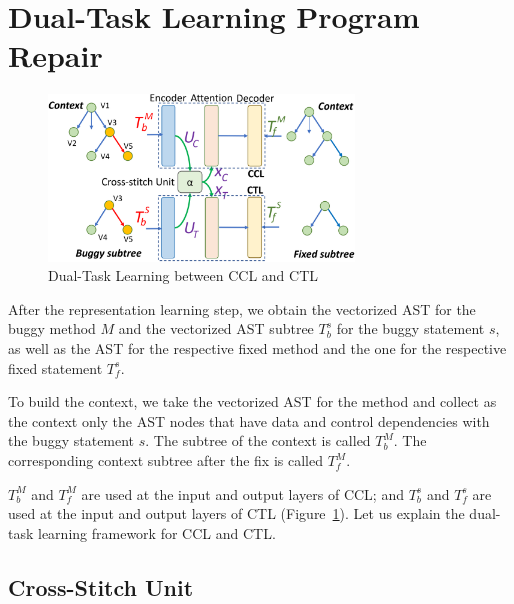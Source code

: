 \section{Dual-Task Learning Program Repair}
\label{sec: dual-learning}

\begin{figure}[t]
	\centering
	\includegraphics[width=3.2in]{graphs/dual-learning-repair-4.png}
        \vspace{-3pt}
	\caption{Dual-Task Learning between CCL and CTL}
	\label{fig:dual-learning}
\end{figure}

After the representation learning step, we obtain the vectorized AST
for the buggy method $M$ and the vectorized AST subtree
$T^{s}_b$ for the buggy statement $s$, as well as the AST for the
respective fixed method
and the one for the respective fixed statement $T^{s}_f$.

To build the context, we take the vectorized AST for the method and
collect as the context only the AST nodes that have data and control
dependencies with the buggy statement $s$. The subtree of the context
is called $T^{M}_b$. The corresponding context subtree after the fix
is called $T^{M}_f$.

$T^{M}_b$ and $T^{M}_f$ are used at the input and output layers of
CCL; and $T^{s}_b$ and $T^{s}_f$ are used at the input and output
layers of CTL (Figure~\ref{fig:dual-learning}).  Let us explain the
dual-task learning framework for CCL and CTL.



\subsection{Cross-Stitch Unit}

